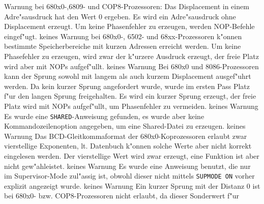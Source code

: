 \documentclass[12pt,a4paper,twoside]{report}
\newcommand{\tty}[1]{{\tt #1}}
\begin{document}
{\begin{description}
               {Warnung}
               {bei 680x0-,6809- und COP8-Prozessoren: Das Displacement
                in einem Adre"sausdruck hat den Wert 0 ergeben.  Es wird
                ein  Adre"sausdruck  ohne Displacement erzeugt.  Um keine
                Phasenfehler zu erzeugen, werden NOP-Befehle eingef"ugt.}
               {keines}
               {Warnung}
               {bei 680x0-, 6502- und 68xx-Prozessoren k"onnen
                bestimmte Speicherbereiche mit kurzen Adressen erreicht
                werden.  Um keine Phasefehler zu erzeugen, wird zwar der
                k"urzere Ausdruck erzeugt, der freie Platz wird aber mit
                NOPs aufgef"ullt.}
               {keines}
               {Warnung}
               {Bei 680x0 und 8086-Prozessoren kann der Sprung
                sowohl mit langem als auch kurzem Displacement ausgef"uhrt
                werden.  Da kein kurzer Sprung angefordert wurde, wurde im
                ersten Pass Platz f"ur den langen Sprung freigehalten.
                Es wird ein kurzer Sprung erzeugt, der freie Platz wird
                mit NOPs aufgef"ullt, um Phasenfehler zu vermeiden.}
               {keines}
               {Warnung}
               {Es wurde eine \tty{SHARED}-Anweisung gefunden, es
                wurde aber keine Kommandozeilenoption angegeben, um eine
                Shared-Datei zu erzeugen.}
               {keines}
               {Warnung}
               {Das BCD-Gleitkommaformat der 680x0-Koprozessoren
                erlaubt zwar vierstellige Exponenten, lt. Datenbuch
                k"onnen solche Werte aber nicht korrekt eingelesen werden.
                Der vierstellige Wert wird zwar erzeugt, eine Funktion ist
                aber nicht gew"ahleistet.}
               {keines}
               {Warnung}
               {Es wurde eine Anweisung benutzt, die nur im
                Supervisor-Mode zul"assig ist, obwohl dieser nicht mittels
                \tty{SUPMODE ON} vorher explizit angezeigt wurde.}
               {keines}
               {Warnung}
               {Ein kurzer Sprung mit der Distanz 0 ist bei
                680x0- bzw. COP8-Prozessoren nicht erlaubt, da dieser Sonderwert f"ur
}
\end{description}}
\end{document}
